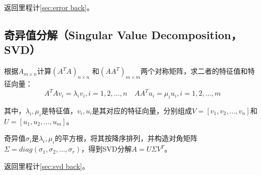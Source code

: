 \documentclass[
12pt, %
a4paper, 
oneside, %
headinclude,footinclude, %
]{scrartcl}
\begin{document}
返回里程计\ref{sec:error back}。
\subsection[奇异值分解]{奇异值分解（Singular Value Decomposition，SVD）}\label{sec:svd}
根据$ A_{m \times n} $计算$ (A^T A)_{n \times n} $ 和$ (AA^T)_{m \times m} $两个对称矩阵，求二者的特征值和特征向量：
$$ A^T A v_i = \lambda_i v_i, i = 1, 2, \dots, n \quad AA^T u_i = \mu_i u_i, i = 1, 2, \dots, m $$

其中，$ \lambda_i, \mu_i $是特征值，$ v_i, u_i $是其对应的特征向量，分别组成$ V = [v_1, v_2, \dots, v_n] $和$ U = [u_1, u_2, \dots, u_m] $。

奇异值$ \sigma_i $是$ \lambda_i, \mu_i $的平方根，将其按降序排列，并构造对角矩阵$ \Sigma = diag(\sigma_1, \sigma_2, \dots, \sigma_r) $，得到SVD分解$ A = U \Sigma V^T $。

返回里程计\ref{sec:svd back}。
\end{document}
